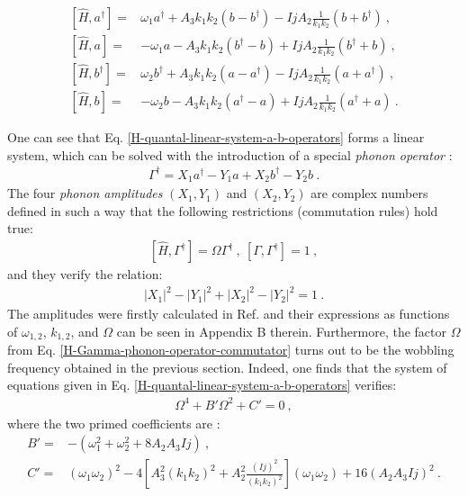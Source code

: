 \begin{align}
    \left[\hat{H},a^\dagger\right]=&\omega_1a^\dagger+A_3k_1k_2(b-b^\dagger)-IjA_2\frac{1}{k_1k_2}(b+b^\dagger)\ ,\nonumber\\
    \left[\hat{H},a\right]=&-\omega_1a-A_3k_1k_2(b^\dagger-b)+IjA_2\frac{1}{k_1k_2}(b^\dagger+b)\ ,\nonumber\\
    \left[\hat{H},b^\dagger\right]=&\omega_2b^\dagger+A_3k_1k_2\left(a-a^\dagger\right)-IjA_2\frac{1}{k_1k_2}\left(a+a^\dagger\right)\ ,\nonumber\\
    \left[\hat{H},b\right]=&-\omega_2b-A_3k_1k_2\left(a^\dagger-a\right)+IjA_2\frac{1}{k_1k_2}\left(a^\dagger+a\right)\ .
    \label{H-quantal-linear-system-a-b-operators}
\end{align}

One can see that Eq. \ref{H-quantal-linear-system-a-b-operators} forms a linear system, which can be solved with the introduction of a special \emph{phonon operator} \cite{raduta2017semiclassical,raduta2018wobbling}:
\begin{align}
    \Gamma^\dagger=X_1a^\dagger-Y_1a+X_2b^\dagger-Y_2b\ .
\end{align}
The four \emph{phonon amplitudes} $(X_1,Y_1)$ and $(X_2,Y_2)$ are complex numbers defined in such a way that the following restrictions (commutation rules) hold true:
\begin{align}
    \left[\hat{H},\Gamma^\dagger\right]=\Omega\Gamma^\dagger\ ,\ \left[\Gamma,\Gamma^\dagger\right]=1\ ,
    \label{H-Gamma-phonon-operator-commutator}
\end{align}
and they verify the relation:
\begin{align}
    \left|X_1\right|^2-\left|Y_1\right|^2+\left|X_2\right|^2-\left|Y_2\right|^2=1\ .
\end{align}
The amplitudes were firstly calculated in Ref. \cite{raduta2007semiclassical} and their expressions as functions of $\omega_{1,2}$, $k_{1,2}$, and $\Omega$ can be seen in Appendix B therein. Furthermore, the factor $\Omega$ from Eq. \ref{H-Gamma-phonon-operator-commutator} turns out to be the wobbling frequency obtained in the previous section. Indeed, one finds that the system of equations given in Eq. \ref{H-quantal-linear-system-a-b-operators} verifies:
\begin{align}
    \Omega^4+B'\Omega^2+C'=0\ ,
\end{align}
where the two primed coefficients are \cite{raduta2020approach}:
\begin{align}
    B'=&-\left(\omega_1^2+\omega_2^2+8A_2A_3Ij\right)\ ,\nonumber\\
    C'=&(\omega_1\omega_2)^2-4\left[A_3^2(k_1k_2)^2+A_2^2\frac{(Ij)^2}{\left(k_1k_2\right)^2}\right]\left(\omega_1\omega_2\right)+16(A_2A_3Ij)^2\ .
    \label{B-C-prime-terms}
\end{align}
